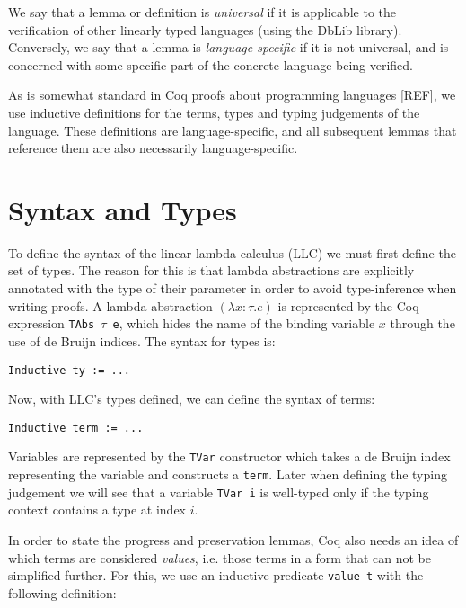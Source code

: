 \documentclass[]{unswthesis}
\let\c\texttt
\begin{document}
We say that a lemma or definition is \textit{universal} if it is applicable to the verification of other linearly typed languages (using the DbLib library). Conversely, we say that a lemma is \textit{language-specific} if it is not universal, and is concerned with some specific part of the concrete language being verified.

As is somewhat standard in Coq proofs about programming languages [REF], we use inductive definitions for the terms, types and typing judgements of the language. These definitions are language-specific, and all subsequent lemmas that reference them are also necessarily language-specific.


\section{Syntax and Types}

To define the syntax of the linear lambda calculus (LLC) we must first define the set of types. The reason for this is that lambda abstractions are explicitly annotated with the type of their parameter in order to avoid type-inference when writing proofs. A lambda abstraction $(\lambda x : \tau. e)$ is represented by the Coq expression \c{TAbs $\tau$ e}, which hides the name of the binding variable $x$ through the use of de Bruijn indices. The syntax for types is:

\begin{verbatim}
Inductive ty := ...
\end{verbatim}

Now, with LLC's types defined, we can define the syntax of terms:

\begin{verbatim}
Inductive term := ...
\end{verbatim}

Variables are represented by the \c{TVar} constructor which takes a de Bruijn index representing the variable and constructs a \c{term}. Later when defining the typing judgement we will see that a variable \c{TVar i} is well-typed only if the typing context contains a type at index $i$.

In order to state the progress and preservation lemmas, Coq also needs an idea of which terms are considered \textit{values}, i.e. those terms in a form that can not be simplified further. For this, we use an inductive predicate \c{value t} with the following definition:
\end{document}
